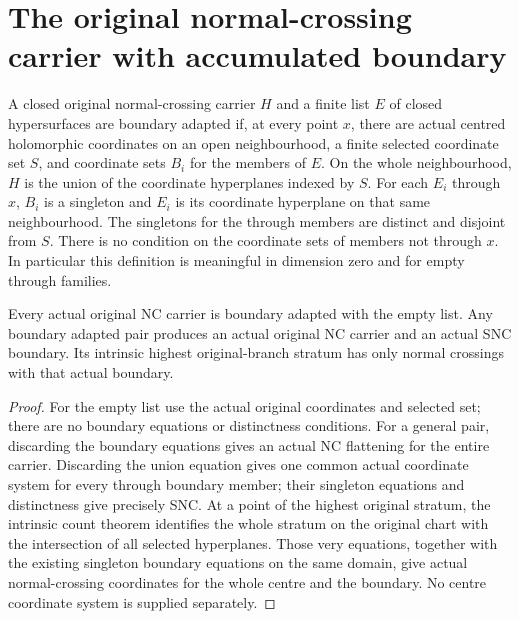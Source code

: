 \section{The original normal-crossing carrier with accumulated boundary}
\label{sec:hironaka-normal-crossings-boundary-transform}

\begin{definition}
\label{hir:general-nc-simultaneous-original-boundary}
\leanok
A closed original normal-crossing carrier $H$ and a finite list $E$ of
closed hypersurfaces are boundary adapted if, at every point $x$, there
are actual centred holomorphic coordinates on an open neighbourhood,
a finite selected coordinate set $S$, and coordinate sets $B_i$ for the
members of $E$. On the whole neighbourhood, $H$ is the union of the
coordinate hyperplanes indexed by $S$. For each $E_i$ through $x$, $B_i$
is a singleton and $E_i$ is its coordinate hyperplane on that same
neighbourhood. The singletons for the through members are distinct and
disjoint from $S$. There is no condition on the coordinate sets of
members not through $x$. In particular this definition is meaningful
in dimension zero and for empty through families.
\end{definition}

\begin{lemma}
\label{hir:general-nc-boundary-empty-producer}
\leanok
Every actual original NC carrier is boundary adapted with the empty
list. Any boundary adapted pair produces an actual original NC carrier
and an actual SNC boundary. Its intrinsic highest original-branch
stratum has only normal crossings with that actual boundary.
\end{lemma}
\begin{proof}
For the empty list use the actual original coordinates and selected
set; there are no boundary equations or distinctness conditions. For a
general pair, discarding the boundary equations gives an actual NC
flattening for the entire carrier. Discarding the union equation gives
one common actual coordinate system for every through boundary member;
their singleton equations and distinctness give precisely SNC.
At a point of the highest original stratum, the intrinsic count theorem
identifies the whole stratum on the original chart with the intersection
of all selected hyperplanes. Those very equations, together with the
existing singleton boundary equations on the same domain, give actual
normal-crossing coordinates for the whole centre and the boundary.
No centre coordinate system is supplied separately.
\end{proof}

